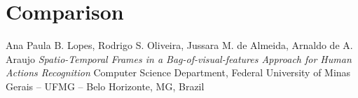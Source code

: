 \documentclass[]{article}
\begin{document}
\section{Comparison}




\begin{thebibliography}{1}

   Ana Paula B. Lopes, Rodrigo S. Oliveira, Jussara M. de Almeida, Arnaldo de A. Araujo {\em Spatio-Temporal Frames in a Bag-of-visual-features Approach for Human Actions Recognition} Computer Science Department, Federal University of Minas Gerais – UFMG – Belo Horizonte, MG, Brazil
\end{thebibliography}        

		
\end{document}
